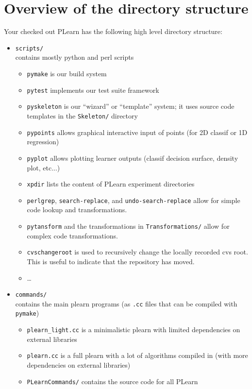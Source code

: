 \documentclass[11pt]{book}
\begin{document}
\chapter{Overview of the directory structure}

Your checked out PLearn has the following high level directory structure:

\begin{itemize}
\item \verb!scripts/! \\
contains mostly python and perl scripts
  \begin{itemize}
  \item {\tt pymake} is our build system 
  \item {\tt pytest} implements our test suite framework
  \item {\tt pyskeleton} is our ``wizard'' or ``template'' system;  it uses source code templates in the {\tt Skeleton/} directory
  \item {\tt pypoints} allows graphical interactive input of points (for 2D classif or 1D regression)
  \item {\tt pyplot} allows plotting learner outputs (classif decision surface, density plot, etc...) 
  \item {\tt xpdir} lists the content of PLearn experiment directories
  \item {\tt perlgrep}, {\tt search-replace}, and {\tt undo-search-replace} allow for simple code lookup and transformations.
  \item {\tt pytansform} and the transformations in {\tt Transformations/} allow for complex code transformations.
  \item {\tt cvschangeroot} is used to recursively change the locally recorded cvs root. This is useful to indicate that the repository has moved.
  \item \ldots
  \end{itemize}
\item \verb!commands/! \\ 
contains the main plearn programs (as {\tt .cc} files that can be compiled with {\tt pymake})
  \begin{itemize}
  \item \verb!plearn_light.cc! is a minimalistic plearn with limited dependencies
    on external libraries
  \item \verb!plearn.cc! is a full plearn with a lot of algorithms
    compiled in (with more dependencies on external libraries)
  \item \verb!PLearnCommands/! contains the source code for all PLearn

\end{itemize}
\end{itemize}
\end{document}
